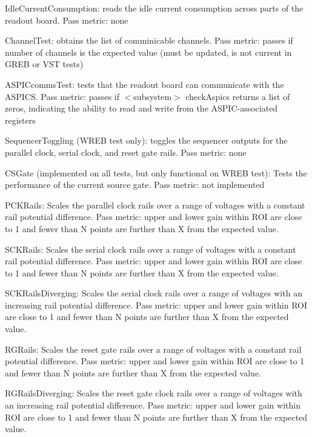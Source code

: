 \begin{DoxyItemize}
\item {\ttfamily Idle\+Current\+Consumption}\+: reads the idle current consumption across parts of the readout board. Pass metric\+: none
\item {\ttfamily Channel\+Test}\+: obtains the list of comminicable channels. Pass metric\+: passes if number of channels is the expected value (must be updated, is not current in G\+R\+EB or V\+ST tests)
\item {\ttfamily A\+S\+P\+I\+Ccomms\+Test}\+: tests that the readout board can communicate with the A\+S\+P\+I\+CS. Pass metric\+: passes if {\ttfamily $<$subsystem$>$ check\+Aspics} returns a list of zeros, indicating the ability to read and write from the A\+S\+P\+I\+C-\/associated registers
\item {\ttfamily Sequencer\+Toggling} (W\+R\+EB test only)\+: toggles the sequencer outputs for the parallel clock, serial clock, and reset gate rails. Pass metric\+: none
\item {\ttfamily C\+S\+Gate} (implemented on all tests, but only functional on W\+R\+EB test)\+: Tests the performance of the current source gate. Pass metric\+: not implemented
\item {\ttfamily P\+C\+K\+Rails}\+: Scales the parallel clock rails over a range of voltages with a constant rail potential difference. Pass metric\+: upper and lower gain within R\+OI are close to 1 and fewer than N points are further than X from the expected value.
\item {\ttfamily S\+C\+K\+Rails}\+: Scales the serial clock rails over a range of voltages with a constant rail potential difference. Pass metric\+: upper and lower gain within R\+OI are close to 1 and fewer than N points are further than X from the expected value.
\item {\ttfamily S\+C\+K\+Rails\+Diverging}\+: Scales the serial clock rails over a range of voltages with an increasing rail potential difference. Pass metric\+: upper and lower gain within R\+OI are close to 1 and fewer than N points are further than X from the expected value.
\item {\ttfamily R\+G\+Rails}\+: Scales the reset gate rails over a range of voltages with a constant rail potential difference. Pass metric\+: upper and lower gain within R\+OI are close to 1 and fewer than N points are further than X from the expected value.
\item {\ttfamily R\+G\+Rails\+Diverging}\+: Scales the reset gate clock rails over a range of voltages with an increasing rail potential difference. Pass metric\+: upper and lower gain within R\+OI are close to 1 and fewer than N points are further than X from the expected value.

\end{DoxyItemize}
